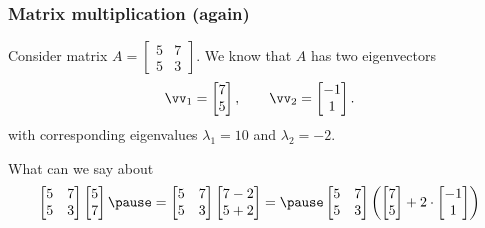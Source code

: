 \begin{frame}
  \frametitle{Matrix multiplication (again)}

  Consider matrix $A=\begin{bmatrix}5 & 7 \\ 5 & 3\end{bmatrix}$.
  We know that $A$ has two eigenvectors
  \[
  \vv_1=\begin{bmatrix} 7 \\ 5 \end{bmatrix}, \ \ \ \ \ \
  \vv_2=\begin{bmatrix} -1 \\ 1 \end{bmatrix}.
  \]
  with corresponding eigenvalues $\lambda_1=10$ and $\lambda_2=-2$.

  \pause What can we say about
  \[
  \begin{bmatrix}
    5 & 7 \\ 5 & 3
  \end{bmatrix}
  \begin{bmatrix}
    5 \\ 7
  \end{bmatrix}
  \pause
  =
  \begin{bmatrix}
    5 & 7 \\ 5 & 3
  \end{bmatrix}
  \begin{bmatrix}
    7 - 2 \\ 5 + 2
  \end{bmatrix}
  =
  \pause
  \begin{bmatrix}
    5 & 7 \\ 5 & 3
  \end{bmatrix}
  \left(
  \begin{bmatrix}
    7 \\ 5
  \end{bmatrix}
  +2\cdot
  \begin{bmatrix}
    -1 \\ 1
  \end{bmatrix}
  \right)
  \]
\end{frame}

